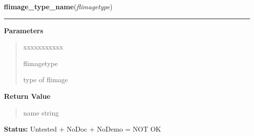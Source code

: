 \hspace{.8\funcindent}\begin{boxedminipage}{\funcwidth}

    \raggedright \textbf{flimage\_type\_name}(\textit{flimagetype})

    \vspace{-1.5ex}

    \rule{\textwidth}{0.5\fboxrule}
\setlength{\parskip}{2ex}
\setlength{\parskip}{1ex}
      \textbf{Parameters}
      \vspace{-1ex}

      \begin{quote}
        \begin{Ventry}{xxxxxxxxxxx}

          \item[flimagetype]

          type of flimage

        \end{Ventry}

      \end{quote}

      \textbf{Return Value}
    \vspace{-1ex}

      \begin{quote}
      name string

      \end{quote}

\textbf{Status:} Untested + NoDoc + NoDemo = NOT OK



    \end{boxedminipage}

    \label{xformslib:flflimage:flimage_add_text}

    \vspace{0.5ex}

